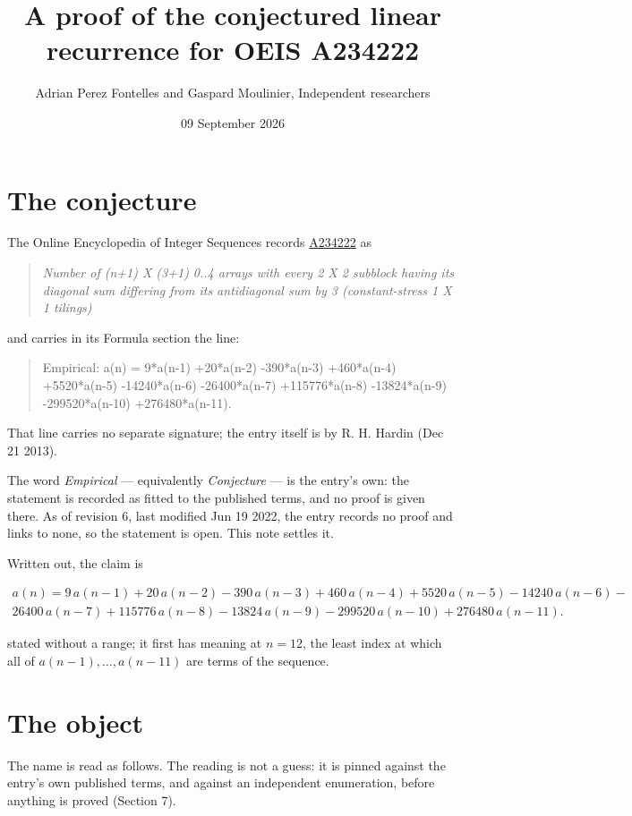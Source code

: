 \documentclass[11pt]{article}
\title{A proof of the conjectured linear recurrence for OEIS A234222}
\author{Adrian Perez Fontelles and Gaspard Moulinier, Independent researchers}
\date{09 September 2026}
\theoremstyle{definition}
\begin{document}
\maketitle
\section{The conjecture}

The Online Encyclopedia of Integer Sequences records \href{https://oeis.org/A234222}{A234222} as

\begin{quote}\itshape Number of (n+1) X (3+1) 0..4 arrays with every 2 X 2 subblock having its diagonal sum differing from its antidiagonal sum by 3 (constant-stress 1 X 1 tilings)\end{quote}

and carries in its Formula section the line:

\begin{quote}\ttfamily Empirical: a(n) = 9*a(n-1) +20*a(n-2) -390*a(n-3) +460*a(n-4) +5520*a(n-5) -14240*a(n-6) -26400*a(n-7) +115776*a(n-8) -13824*a(n-9) -299520*a(n-10) +276480*a(n-11).\end{quote}

That line carries no separate signature; the entry itself is by R. H. Hardin (Dec 21 2013).

The word {\itshape Empirical} --- equivalently {\itshape Conjecture} --- is the entry's own: the statement is recorded as fitted to the published terms, and no proof is given there. As of revision 6, last modified Jun 19 2022, the entry records no proof and links to none, so the statement is open. This note settles it.

Written out, the claim is

\begin{multline*} a(n) = 9\,a(n-1) + 20\,a(n-2) - 390\,a(n-3) + 460\,a(n-4) + 5520\,a(n-5) - 14240\,a(n-6) - \\ 26400\,a(n-7) + 115776\,a(n-8) - 13824\,a(n-9) - 299520\,a(n-10) + 276480\,a(n-11). \end{multline*}

stated without a range; it first has meaning at $n = 12$, the least index at which all of $a(n-1),\dots,a(n-11)$ are terms of the sequence.

\section{The object}

The name is read as follows. The reading is not a guess: it is pinned against the entry's own published terms, and against an independent enumeration, before anything is proved (Section 7).
\end{document}
